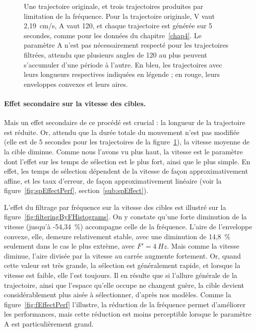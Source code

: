 \begin{figure}[htbp]
		\caption[Filtrage des trajectoires par limitation de fréquence]{Une trajectoire originale, et trois trajectoires produites par limitation de la fréquence. Pour la trajectoire originale, V vaut 2,19~cm/s, A vaut 120\textdegree{}, et chaque trajectoire est générée sur 5 secondes, comme pour les données du chapitre~\ref{chap4}. Le paramètre A n'est pas nécessairement respecté pour les trajectoires filtrées, attendu que plusieurs angles de 120\textdegree{} au plus peuvent s'accumuler d'une période à l'autre. En bleu, les trajectoires avec leurs longueurs respectives indiquées en légende ; en rouge, leurs enveloppes convexes et leurs aires.}
		\label{fig:filterF}
	\end{figure}
	
	\paragraph{Effet secondaire sur la vitesse des cibles.}
	Mais un effet secondaire de ce procédé est crucial : la longueur de la trajectoire est réduite. Or, attendu que la durée totale du mouvement n'est pas modifiée (elle est de 5 secondes pour les trajectoires de la figure~\ref{fig:filterF}), la vitesse moyenne de la cible diminue. Comme nous l'avons vu plus haut, la vitesse est le paramètre dont l'effet sur les temps de sélection est le plus fort, ainsi que le plus simple. En effet, les temps de sélection dépendent de la vitesse de façon approximativement affine, et les taux d'erreur, de façon approximativement linéaire (voir la figure~\ref{fig:spEffectPerf}, section~\ref{sub:spEffect}).
	
	L'effet du filtrage par fréquence sur la vitesse des cibles est illustré sur la figure~\ref{fig:filteringByFHistograms}. On y constate qu'une forte diminution de la vitesse (jusqu'à -54,34~\%{}) accompagne celle de la fréquence. L'aire de l'enveloppe convexe, elle, demeure relativement stable, avec une diminution de 14,8~\%{} seulement dans le cas le plus extrème, avec $F'=4~Hz$. Mais comme la vitesse diminue, l'aire divisée par la vitesse au carrée augmente fortement. Or, quand cette valeur est très grande, la sélection est généralement rapide, et lorsque la vitesse est faible, elle l'est toujours. Il en résulte que si l'allure générale de la trajectoire, ainsi que l'espace qu'elle occupe ne changent guère, la cible devient considérablement plus aisée à sélectionner, d'après nos modèles. Comme la figure~\ref{fig:fEffectPerf} l'illustre, la réduction de la fréquence permet d'améliorer les performances, mais cette réduction est moins perceptible lorsque le paramètre A est particulièrement grand.

